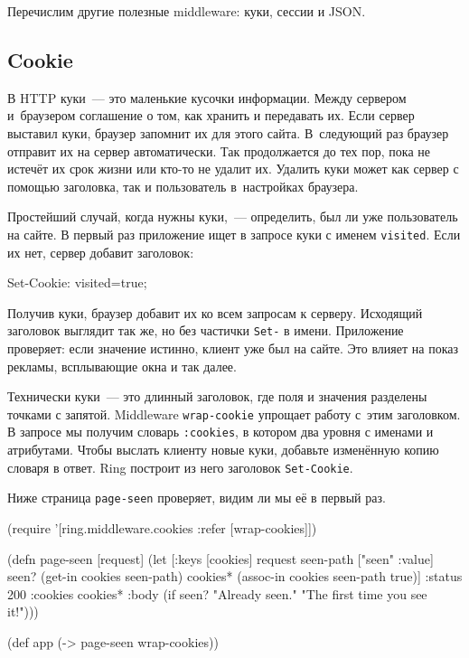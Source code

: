 Перечислим другие полезные middleware: куки, сессии и JSON.

\subsection{Cookie}


В HTTP куки~--- это маленькие кусочки информации. Между сервером и~браузером
соглашение о том, как хранить и передавать их. Если сервер выставил куки,
браузер запомнит их для этого сайта. В~следующий раз браузер отправит их на
сервер автоматически. Так продолжается до тех пор, пока не истечёт их срок
жизни или кто-то не удалит их. Удалить куки может как сервер с помощью
заголовка, так и пользователь в~настройках браузера.

Простейший случай, когда нужны куки,~--- определить, был ли уже пользователь на
сайте. В первый раз приложение ищет в запросе куки с именем
\verb|visited|. Если их нет, сервер добавит заголовок:

\begin{english}
  \begin{http}
Set-Cookie: visited=true;
  \end{http}
\end{english}

Получив куки, браузер добавит их ко всем запросам к серверу. Исходящий заголовок
выглядит так же, но без частички \verb|Set-| в имени. Приложение проверяет: если
значение истинно, клиент уже был на сайте. Это влияет на показ рекламы,
всплывающие окна и так далее.

Технически куки~--- это длинный заголовок, где поля и значения разделены точками с
запятой. Middleware \verb|wrap-cookie| упрощает работу с~этим заголовком. В
запросе мы получим словарь \verb|:cookies|, в котором два уровня с именами и
атрибутами. Чтобы выслать клиенту новые куки, добавьте изменённую копию словаря
в ответ. Ring построит из него заголовок \verb|Set-Cookie|.

Ниже страница \verb|page-seen| проверяет, видим ли мы её в первый раз.


\ifx\DEVICETYPE\MOBILE

\begin{english}
  \begin{clojure/lines}
(require '[ring.middleware.cookies
           :refer [wrap-cookies]])

(defn page-seen [request]
  (let [{:keys [cookies]} request
        seen-path ["seen" :value]
        seen? (get-in cookies
                      seen-path)
        cookies* (assoc-in cookies
                   seen-path true)]
    {:status 200
     :cookies cookies*
     :body
     (if seen?
      "Already seen."
      "The first time you see it!")}))

(def app (-> page-seen
             wrap-cookies))
  \end{clojure/lines}
\end{english}

